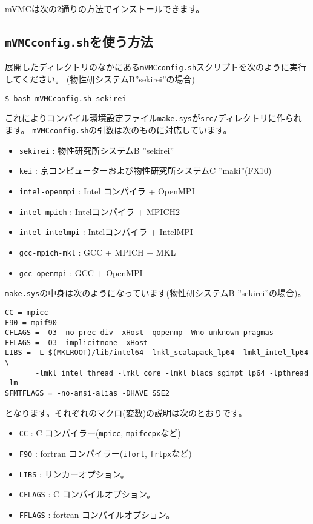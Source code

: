 mVMCは次の2通りの方法でインストールできます。

\subsection{\texttt{mVMCconfig.sh}を使う方法}

展開したディレクトリのなかにある\verb|mVMCconfig.sh|スクリプトを次のように実行してください。
(物性研システムB''sekirei''の場合)
\begin{verbatim}
$ bash mVMCconfig.sh sekirei
\end{verbatim}
これによりコンパイル環境設定ファイル\verb|make.sys|が\verb|src/|ディレクトリに作られます。
\verb|mVMCconfig.sh|の引数は次のものに対応しています。
\begin{itemize}
\item \verb|sekirei| : 物性研究所システムB ''sekirei''
\item \verb|kei| : 京コンピューターおよび物性研究所システムC ''maki''(FX10)
\item \verb|intel-openmpi| : Intel コンパイラ + OpenMPI
\item \verb|intel-mpich| : Intelコンパイラ + MPICH2
\item \verb|intel-intelmpi| : Intelコンパイラ + IntelMPI
\item \verb|gcc-mpich-mkl| : GCC + MPICH + MKL
\item \verb|gcc-openmpi| : GCC + OpenMPI
\end{itemize}

\verb|make.sys|の中身は次のようになっています(物性研システムB ''sekirei''の場合)。
\begin{verbatim}
CC = mpicc
F90 = mpif90
CFLAGS = -O3 -no-prec-div -xHost -qopenmp -Wno-unknown-pragmas
FFLAGS = -O3 -implicitnone -xHost
LIBS = -L $(MKLROOT)/lib/intel64 -lmkl_scalapack_lp64 -lmkl_intel_lp64 \
       -lmkl_intel_thread -lmkl_core -lmkl_blacs_sgimpt_lp64 -lpthread -lm
SFMTFLAGS = -no-ansi-alias -DHAVE_SSE2
\end{verbatim}
となります。それぞれのマクロ(変数)の説明は次のとおりです。
\begin{itemize}
\item \verb|CC| : C コンパイラー(\verb|mpicc|, \verb|mpifccpx|など)
\item \verb|F90| : fortran コンパイラー(\verb|ifort|, \verb|frtpx|など)
\item \verb|LIBS| : リンカーオプション。
\item \verb|CFLAGS| : C コンパイルオプション。
\item \verb|FFLAGS| : fortran コンパイルオプション。
\end{itemize}

